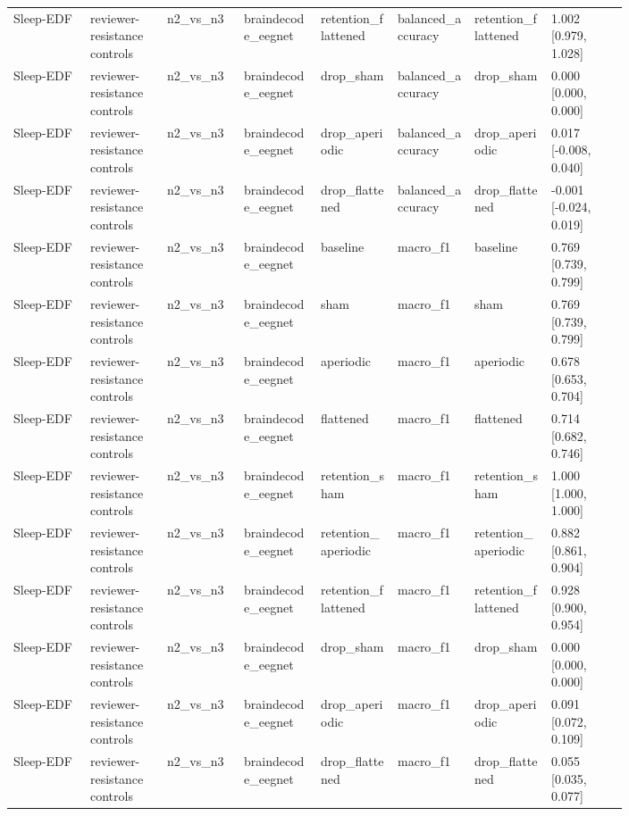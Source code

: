 \begin{longtable}{p{0.10\linewidth}p{0.10\linewidth}p{0.10\linewidth}p{0.10\linewidth}p{0.10\linewidth}p{0.10\linewidth}p{0.10\linewidth}p{0.10\linewidth}}
Sleep-EDF & reviewer-resistance controls & n2\_vs\_n3 & braindecode\_eegnet & retention\_flattened & balanced\_accuracy & retention\_flattened & 1.002 [0.979, 1.028]\\
Sleep-EDF & reviewer-resistance controls & n2\_vs\_n3 & braindecode\_eegnet & drop\_sham & balanced\_accuracy & drop\_sham & 0.000 [0.000, 0.000]\\
Sleep-EDF & reviewer-resistance controls & n2\_vs\_n3 & braindecode\_eegnet & drop\_aperiodic & balanced\_accuracy & drop\_aperiodic & 0.017 [-0.008, 0.040]\\
Sleep-EDF & reviewer-resistance controls & n2\_vs\_n3 & braindecode\_eegnet & drop\_flattened & balanced\_accuracy & drop\_flattened & -0.001 [-0.024, 0.019]\\
Sleep-EDF & reviewer-resistance controls & n2\_vs\_n3 & braindecode\_eegnet & baseline & macro\_f1 & baseline & 0.769 [0.739, 0.799]\\
Sleep-EDF & reviewer-resistance controls & n2\_vs\_n3 & braindecode\_eegnet & sham & macro\_f1 & sham & 0.769 [0.739, 0.799]\\
Sleep-EDF & reviewer-resistance controls & n2\_vs\_n3 & braindecode\_eegnet & aperiodic & macro\_f1 & aperiodic & 0.678 [0.653, 0.704]\\
Sleep-EDF & reviewer-resistance controls & n2\_vs\_n3 & braindecode\_eegnet & flattened & macro\_f1 & flattened & 0.714 [0.682, 0.746]\\
Sleep-EDF & reviewer-resistance controls & n2\_vs\_n3 & braindecode\_eegnet & retention\_sham & macro\_f1 & retention\_sham & 1.000 [1.000, 1.000]\\
Sleep-EDF & reviewer-resistance controls & n2\_vs\_n3 & braindecode\_eegnet & retention\_aperiodic & macro\_f1 & retention\_aperiodic & 0.882 [0.861, 0.904]\\
Sleep-EDF & reviewer-resistance controls & n2\_vs\_n3 & braindecode\_eegnet & retention\_flattened & macro\_f1 & retention\_flattened & 0.928 [0.900, 0.954]\\
Sleep-EDF & reviewer-resistance controls & n2\_vs\_n3 & braindecode\_eegnet & drop\_sham & macro\_f1 & drop\_sham & 0.000 [0.000, 0.000]\\
Sleep-EDF & reviewer-resistance controls & n2\_vs\_n3 & braindecode\_eegnet & drop\_aperiodic & macro\_f1 & drop\_aperiodic & 0.091 [0.072, 0.109]\\
Sleep-EDF & reviewer-resistance controls & n2\_vs\_n3 & braindecode\_eegnet & drop\_flattened & macro\_f1 & drop\_flattened & 0.055 [0.035, 0.077]\\

\end{longtable}
